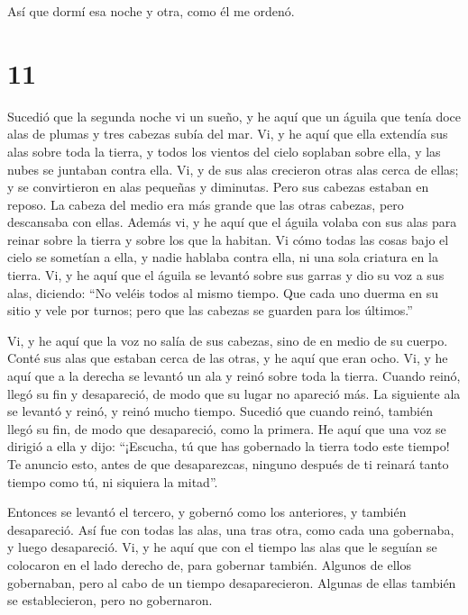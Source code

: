 Así que dormí esa noche y otra, como él me ordenó.

\hypertarget{section-10}{%
\section{11}\label{section-10}}

 Sucedió que la segunda noche vi un sueño, y he aquí que
un águila que tenía doce alas de plumas y tres cabezas subía del mar.
 Vi, y he aquí que ella extendía sus alas sobre toda la
tierra, y todos los vientos del cielo soplaban sobre ella, y las nubes
se juntaban contra ella.  Vi, y de sus alas crecieron
otras alas cerca de ellas; y se convirtieron en alas pequeñas y
diminutas.  Pero sus cabezas estaban en reposo. La cabeza
del medio era más grande que las otras cabezas, pero descansaba con
ellas.  Además vi, y he aquí que el águila volaba con sus
alas para reinar sobre la tierra y sobre los que la habitan.
 Vi cómo todas las cosas bajo el cielo se sometían a ella,
y nadie hablaba contra ella, ni una sola criatura en la tierra.
 Vi, y he aquí que el águila se levantó sobre sus garras y
dio su voz a sus alas, diciendo:  ``No veléis todos al
mismo tiempo. Que cada uno duerma en su sitio y vele por turnos;
 pero que las cabezas se guarden para los últimos.''

 Vi, y he aquí que la voz no salía de sus cabezas, sino
de en medio de su cuerpo.  Conté sus alas que estaban
cerca de las otras, y he aquí que eran ocho.  Vi, y he
aquí que a la derecha se levantó un ala y reinó sobre toda la tierra.
 Cuando reinó, llegó su fin y desapareció, de modo que su
lugar no apareció más. La siguiente ala se levantó y reinó, y reinó
mucho tiempo.  Sucedió que cuando reinó, también llegó su
fin, de modo que desapareció, como la primera.  He aquí
que una voz se dirigió a ella y dijo:  ``¡Escucha, tú que
has gobernado la tierra todo este tiempo! Te anuncio esto, antes de que
desaparezcas,  ninguno después de ti reinará tanto tiempo
como tú, ni siquiera la mitad''.

 Entonces se levantó el tercero, y gobernó como los
anteriores, y también desapareció.  Así fue con todas las
alas, una tras otra, como cada una gobernaba, y luego desapareció.
 Vi, y he aquí que con el tiempo las alas que le seguían
se colocaron en el lado derecho de, para gobernar también. Algunos de
ellos gobernaban, pero al cabo de un tiempo desaparecieron.
 Algunas de ellas también se establecieron, pero no
gobernaron.

